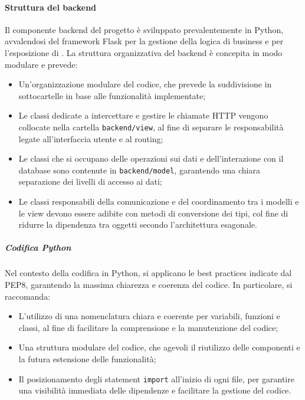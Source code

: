 \paragraph{Struttura del backend}
Il componente backend del progetto è sviluppato prevalentemente in Python, avvalendosi del framework Flask per la gestione della logica di business e per l'esposizione di . La struttura organizzativa del backend è concepita in modo modulare e prevede:
\begin{itemize}
    \item Un'organizzazione modulare del codice, che prevede la suddivisione in sottocartelle in base alle funzionalità implementate;
    \item Le classi dedicate a intercettare e gestire le chiamate HTTP vengono collocate nella cartella \texttt{backend/view}, al fine di separare le responsabilità legate all'interfaccia utente e al routing;
    \item Le classi che si occupano delle operazioni sui dati e dell'interazione con il database sono contenute in \texttt{backend/model}, garantendo una chiara separazione dei livelli di accesso ai dati;
    \item Le classi responsabili della comunicazione e del coordinamento tra i modelli e le view devono essere adibite con metodi di conversione dei tipi, col fine di ridurre la dipendenza tra oggetti secondo l'architettura esagonale.
\end{itemize}

\subparagraph{Codifica Python}
Nel contesto della codifica in Python, si applicano le best practices indicate dal PEP8, garantendo la massima chiarezza e coerenza del codice. In particolare, si raccomanda:
\begin{itemize}
    \item L'utilizzo di una nomenclatura chiara e coerente per variabili, funzioni e classi, al fine di facilitare la comprensione e la manutenzione del codice;
    \item Una struttura modulare del codice, che agevoli il riutilizzo delle componenti e la futura estensione delle funzionalità;
    \item Il posizionamento degli statement \texttt{import} all'inizio di ogni file, per garantire una visibilità immediata delle dipendenze e facilitare la gestione del codice.
\end{itemize}

